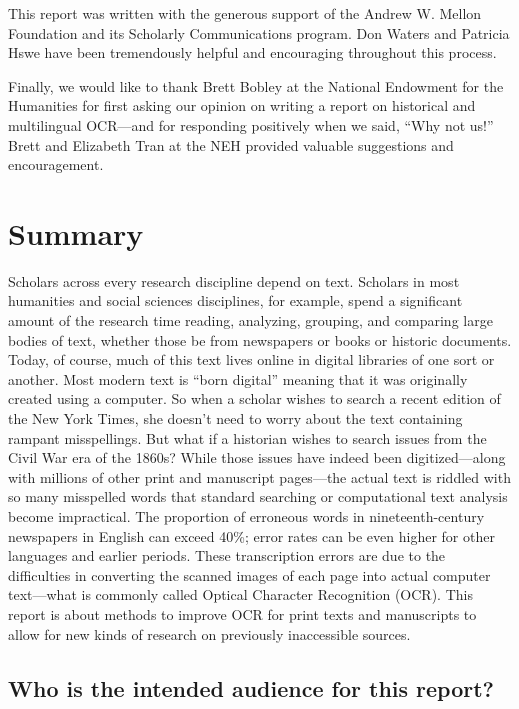 \documentclass[twoside,11pt]{report}
\begin{document}
This report was written with the generous support of the Andrew W. Mellon Foundation and its Scholarly Communications program.  Don Waters and Patricia Hswe have been tremendously helpful and encouraging throughout this process.

Finally, we would like to thank Brett Bobley at the National Endowment for the Humanities for first asking our opinion on writing a report on historical and multilingual OCR---and for responding positively when we said, ``Why not us!'' Brett and Elizabeth Tran at the NEH provided  valuable suggestions and encouragement.

\chapter{Summary}
\label{sec:summary}

Scholars across every research discipline depend on text. Scholars in most humanities and social sciences disciplines, for example, spend a significant amount of the research time reading, analyzing, grouping, and comparing large bodies of text, whether those be from newspapers or books or historic documents. Today, of course, much of this text lives online in digital libraries of one sort or another. Most modern text is ``born digital'' meaning that it was originally created using a computer. So when a scholar wishes to search a recent edition of the New York Times, she doesn't need to worry about the text containing rampant misspellings. But what if a historian wishes to search issues from the Civil War era of the 1860s? While those issues have indeed been digitized---along with millions of other print and manuscript pages---the actual text is riddled with so many misspelled words that standard searching or computational text analysis become impractical. The proportion of erroneous words in nineteenth-century newspapers in English can exceed 40\%; error rates can be even higher for other languages and earlier periods. These transcription errors are due to the difficulties in converting the scanned images of each page into actual computer text---what is commonly called Optical Character Recognition (OCR). This report is about methods to improve OCR for print texts and manuscripts to allow for new kinds of research on previously inaccessible sources.

\section{Who is the intended audience for this report?}
\end{document}
